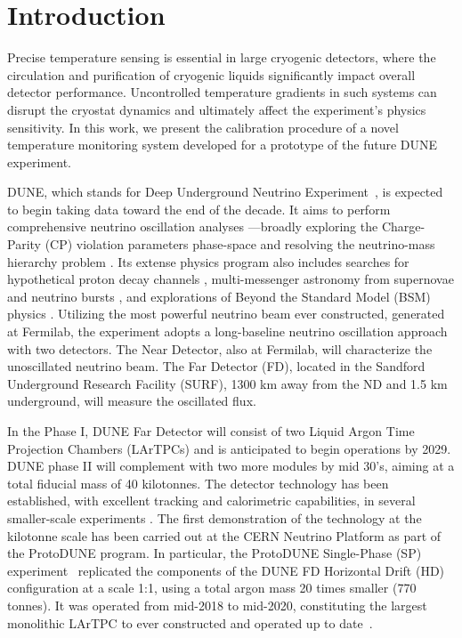 \section{Introduction}
\label{sec:introduction}

\noindent Precise temperature sensing is essential in large cryogenic detectors, where the circulation and purification of cryogenic liquids significantly impact overall detector performance. Uncontrolled temperature gradients in such systems can disrupt the cryostat dynamics and ultimately affect the experiment's physics sensitivity. In this work, we present the calibration procedure of a novel temperature monitoring system developed for a prototype of the future DUNE experiment.

DUNE, which stands for Deep Underground Neutrino Experiment~\cite{dune_tdr1}, is expected to begin taking data toward the end of the decade. It aims to perform comprehensive neutrino oscillation analyses ---broadly exploring the Charge-Parity (CP) violation parameters phase-space and resolving the neutrino-mass hierarchy problem \cite{bib:dune_osc}. Its extense physics program also includes searches for hypothetical proton decay channels \cite{bib:dune_tdr2}, multi-messenger astronomy from supernovae and neutrino bursts \cite{bib:dune_supernova}, and explorations of Beyond the Standard Model (BSM) physics \cite{bib:dune_bsm}. Utilizing the most powerful neutrino beam ever constructed, generated at Fermilab, the experiment adopts a long-baseline neutrino oscillation approach with two detectors. The Near Detector, also at Fermilab, will characterize the unoscillated neutrino beam. The Far Detector (FD), located in the Sandford Underground Research Facility (SURF), 1300 km away from the ND and 1.5 km underground, will measure the oscillated flux.

In the Phase I, DUNE Far Detector will consist of two Liquid Argon Time Projection Chambers (LArTPCs) and is anticipated to begin operations by 2029. DUNE phase II will complement with two more modules by mid 30's, aiming at a total fiducial mass of 40 kilotonnes. The detector technology has been established, with excellent tracking and calorimetric capabilities, in several smaller-scale experiments \cite{icarus,microboone}. The first demonstration of the technology at the kilotonne scale has been carried out at the CERN Neutrino Platform as part of the ProtoDUNE program. In particular, the ProtoDUNE Single-Phase (SP) experiment~\cite{pdsp_tdr} replicated the components of the DUNE FD Horizontal Drift (HD)~\cite{dune_tdr4} configuration at a scale 1:1, using a total argon mass 20 times smaller (770 tonnes). It was operated from mid-2018 to mid-2020, constituting the largest monolithic LArTPC to ever constructed and operated up to date~\cite{pdsp_1,pdsp_2}.

